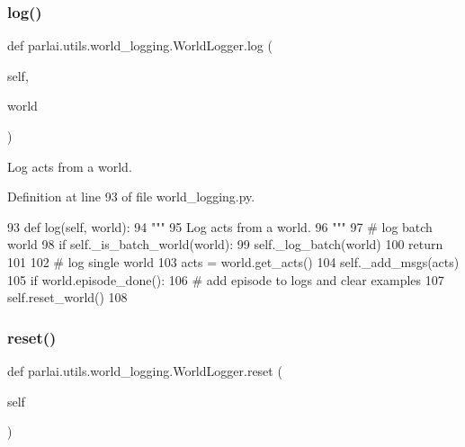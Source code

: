 \subsubsection{\texorpdfstring{log()}{log()}}
{\footnotesize\ttfamily def parlai.\+utils.\+world\+\_\+logging.\+World\+Logger.\+log (\begin{DoxyParamCaption}\item[{}]{self,  }\item[{}]{world }\end{DoxyParamCaption})}

\begin{DoxyVerb}Log acts from a world.
\end{DoxyVerb}
 

Definition at line 93 of file world\+\_\+logging.\+py.


\begin{DoxyCode}
93     \textcolor{keyword}{def }log(self, world):
94         \textcolor{stringliteral}{"""}
95 \textcolor{stringliteral}{        Log acts from a world.}
96 \textcolor{stringliteral}{        """}
97         \textcolor{comment}{# log batch world}
98         \textcolor{keywordflow}{if} self.\_is\_batch\_world(world):
99             self.\_log\_batch(world)
100             \textcolor{keywordflow}{return}
101 
102         \textcolor{comment}{# log single world}
103         acts = world.get\_acts()
104         self.\_add\_msgs(acts)
105         \textcolor{keywordflow}{if} world.episode\_done():
106             \textcolor{comment}{# add episode to logs and clear examples}
107             self.reset\_world()
108 
\end{DoxyCode}
\mbox{\label{classparlai_1_1utils_1_1world__logging_1_1WorldLogger_ae53d57ea1f9df92d06b7d63bd8235bd5}} 
\subsubsection{\texorpdfstring{reset()}{reset()}}
{\footnotesize\ttfamily def parlai.\+utils.\+world\+\_\+logging.\+World\+Logger.\+reset (\begin{DoxyParamCaption}\item[{}]{self }\end{DoxyParamCaption})}



